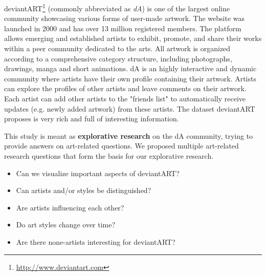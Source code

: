 deviantART\footnote{\url{http://www.deviantart.com}} (commonly abbreviated as \textit{dA}) is one of the largest online community showcasing various forms of user-made artwork.
The website was launched in 2000 and has over 13 million registered members.
The platform allows emerging and established artists to exhibit, promote, and share their works within a peer community dedicated to the arts. 
All artwork is organized according to a comprehensive category structure, including photographs, drawings, manga and short animations.
dA is an highly interactive and dynamic community where artists have their own profile containing their artwork.
Artists can explore the profiles of other artists and leave comments on their artwork.
Each artist can add other artists to the "friends list" to automatically receive updates (e.g. newly added artwork) from these artists.
The dataset deviantART proposes is very rich and full of interesting information.




This study is meant as \textbf{explorative research} on the dA community, trying to provide answers on art-related questions.
We proposed multiple art-related research questions that form the basis for our explorative research.
\begin{itemize}
\item Can we visualize important aspects of deviantART?
\item Can artists and/or styles be distinguished?
\item Are artists influencing each other?
\item Do art styles change over time?
\item Are there none-artists interesting for deviantART?
\end{itemize}

